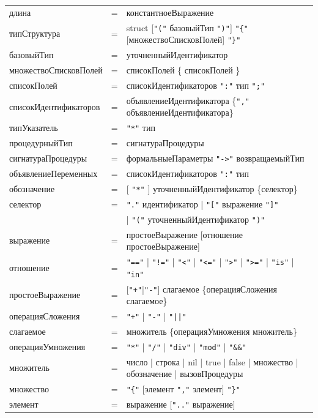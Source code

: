\documentclass[a4paper,12pt]{article}
\newcommand{\lit}[1]{\texttt{"#1"}}
\begin{document}
\begin{center}
\begin{longtable}{l c l}
            длина & = & константноеВыражение \\
            типСтруктура & = & struct [\lit{(} базовыйТип \lit{)}] \lit{\{} [множествоСписковПолей] \lit{\}} \\
            базовыйТип & = & уточненныйИдентификатор \\
            множествоСписковПолей & = & списокПолей \{ списокПолей \} \\
            списокПолей & = & списокИдентификаторов \lit{:} тип \lit{;} \\
            списокИдентификаторов & = & объявлениеИдентификатора \{\lit{,} объявлениеИдентификатора\} \\
            типУказатель & = & \lit{*} тип \\
            процедурныйТип & = & сигнатураПроцедуры \\
            сигнатураПроцедуры & = & формальныеПараметры \lit{->} возвращаемыйТип \\
            объявлениеПеременных & = & списокИдентификаторов \lit{:} тип \\
            обозначение & = & [ \lit{*} ] уточненныйИдентификатор \{селектор\} \\
            селектор & = & \lit{.} идентификатор | \lit{[} выражение \lit{]} \\
            & & | \lit{(} уточненныйИдентификатор \lit{)} \\
            выражение & = & простоеВыражение [отношение простоеВыражение] \\
            отношение & = & \lit{==} | \lit{!=} | \lit{<} | \lit{<=} | \lit{>} | \lit{>=} | \lit{is} | \lit{in} \\
            простоеВыражение & = & [\lit{+}|\lit{-}] слагаемое \{операцияСложения слагаемое\} \\
            операцияСложения & = & \lit{+} | \lit{-} | \lit{||} \\
            слагаемое & = & множитель \{операцияУмножения множитель\} \\
            операцияУмножения & = & \lit{*} | \lit{/} | \lit{div} | \lit{mod} | \lit{\&\&} \\
            множитель & = & число | строка | nil | true | false | множество | обозначение | вызовПроцедуры \\
            множество & = & \lit{\{} [элемент {\lit{,} элемент}] \lit{\}} \\
            элемент & = & выражение [\lit{..} выражение] \\

\end{longtable}
\end{center}
\end{document}
